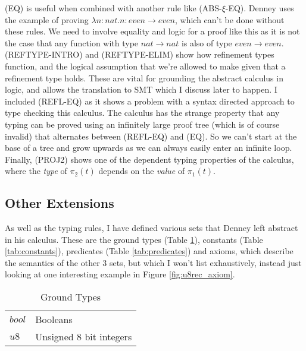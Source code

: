 (EQ) is useful when combined with another rule like (ABS-$\xi$-EQ).
Denney uses the example of proving $\lambda n: nat.n : even \rightarrow even$, which can't be done
without these rules.
We need to involve equality and logic for a proof like this as it is not the case that any function
with type $nat \rightarrow nat$ is also of type $even \rightarrow even$.
(REFTYPE-INTRO) and (REFTYPE-ELIM) show how refinement types function, and the logical assumption
that we're allowed to make given that a refinement type holds.
These are vital for grounding the abstract calculus in logic, and allows the translation to SMT
which I discuss later to happen.
I included (REFL-EQ) as it shows a problem with a syntax directed approach to type checking this
calculus.
The calculus has the strange property that any typing can be proved using an infinitely large
proof tree (which is of course invalid) that alternates between (REFL-EQ) and (EQ).
So we can't start at the base of a tree and grow upwards as we can always easily enter an infinite
loop.
Finally, (PROJ2) shows one of the dependent typing properties of the calculus, where the \textit{type}
of $\pi_2(t)$ depends on the \textit{value} of $\pi_1(t)$.

\subsection{Other Extensions}

As well as the typing rules, I have defined various sets that Denney left abstract in his calculus.
These are the ground types (Table \ref{tab:ground_types}), constants (Table \ref{tab:constants}),
predicates (Table \ref{tab:predicates}) and axioms, which describe the semantics of the other 3
sets, but which I won't list exhaustively, instead just looking at one interesting example in
Figure \ref{fig:u8rec_axiom}.

\begin{table}
    \centering
    \begin{tabular}{|l|l|}
        \cline{1-2}
        $bool$ & Booleans\\\cline{1-2}
        $u8$ & Unsigned 8 bit integers\\\cline{1-2}
    \end{tabular}
    \caption{Ground Types}
    \label{tab:ground_types}
\end{table}

